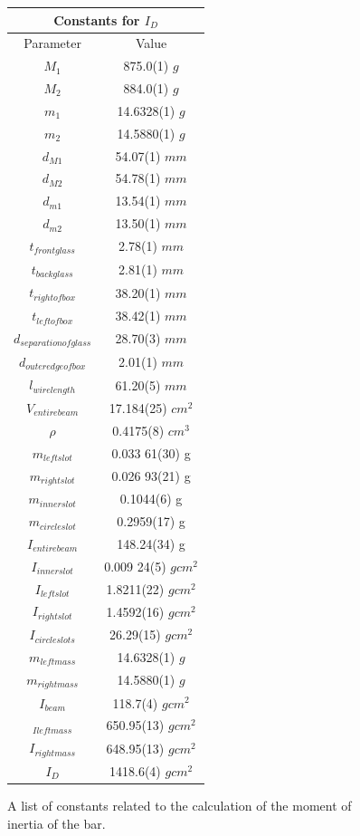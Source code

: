 \documentclass[aps,prl,10pt,twocolumn,floatfix]{revtex4-2}
\begin{document}
\begin{figure}
\begin{tabular}{ |c c| } 
\hline
\multicolumn{2}{|c|}{Constants for $I_D$}\\
\hline
Parameter & Value \\
$M_1$ & 875.0(1) $g$ \\
$M_2$ & 884.0(1) $g$ \\
$m_1$ & 14.6328(1) $g$ \\
$m_2$ & 14.5880(1) $g$ \\
$d_{M1}$ & 54.07(1) $mm$\\
$d_{M2}$ & 54.78(1) $mm$\\
$d_{m1}$ & 13.54(1) $mm$\\
$d_{m2}$ & 13.50(1) $mm$\\
$t_{frontglass}$ & 2.78(1) $mm$\\
$t_{backglass}$ & 2.81(1) $mm$\\
$t_{rightofbox}$ & 38.20(1) $mm$\\
$t_{leftofbox}$ & 38.42(1) $mm$\\
$d_{separationofglass}$ & 28.70(3) $mm$\\
$d_{outeredgeofbox}$ & 2.01(1) $mm$\\
$l_{wirelength}$ & 61.20(5) $mm$\\
\hline
$V_{entirebeam}$ & 17.184(25) $cm^2$\\
$\rho$ & 0.4175(8) $cm^3$\\
$m_{leftslot}$ & 0.033 61(30) g\\
$m_{rightslot}$ & 0.026 93(21) g\\
$m_{innerslot}$ & 0.1044(6) g\\
$m_{circleslot}$ & 0.2959(17) g\\
$I_{entirebeam}$ & 148.24(34) g\\
$I_{innerslot}$ & 0.009 24(5) $gcm^2$\\
$I_{leftslot}$ & 1.8211(22) $gcm^2$\\
$I_{rightslot}$ & 1.4592(16) $gcm^2$\\
$I_{circleslots}$ & 26.29(15) $gcm^2$\\
$m_{leftmass}$ & 14.6328(1) $g$\\
$m_{rightmass}$ & 14.5880(1) $g$\\
$I_{beam}$ & 118.7(4) $gcm^2$\\
$_{Ileftmass}$ & 650.95(13) $gcm^2$\\
$I_{rightmass}$ & 648.95(13) $gcm^2$\\
\hline
$I_D$ & 1418.6(4) $gcm^2$\\
\hline
\end{tabular}
\label{measure}
\caption{A list of constants related to the calculation of the moment of inertia of the bar.}
\end{figure}
\end{document}
